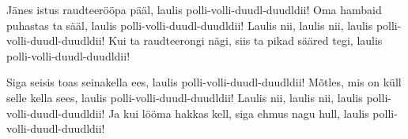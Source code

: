 J\"anes istus raudteer\"o\"opa p\"a\"al,
laulis polli-volli-duudl-duudldii!
Oma hambaid puhastas ta s\"a\"al,
laulis polli-volli-duudl-duudldii!
Laulis nii, laulis nii,
laulis polli-volli-duudl-duudldii!
Kui ta raudteerongi n\"agi,
siis ta pikad s\"a\"ared tegi,
laulis polli-volli-duudl-duudldii!

Siga seisis toas seinakella ees,
laulis polli-volli-duudl-duudldii!
M\~otles, mis on k\"ull selle kella sees,
laulis polli-volli-duudl-duudldii!
Laulis nii, laulis nii,
laulis polli-volli-duudl-duudldii!
Ja kui l\"o\"oma hakkas kell,
siga ehmus nagu hull,
laulis polli-volli-duudl-duudldii!